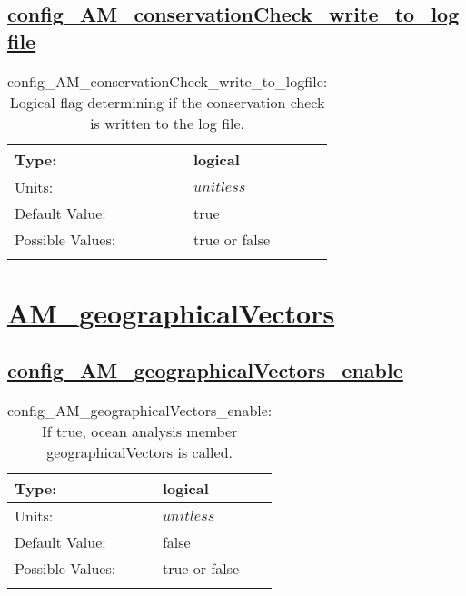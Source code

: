 \subsection[config\_AM\_conservationCheck\_write\_to\_logfile]{\hyperref[sec:nm_tab_AM_conservationCheck]{config\_AM\_conservationCheck\_write\_to\_logfile}}
\label{subsec:nm_sec_config_AM_conservationCheck_write_to_logfile}
\begin{center}
\begin{longtable}{| p{2.0in} || p{4.0in} |}
    \hline
    Type: & logical \\
    \hline
    Units: & $unitless$ \\
    \hline
    Default Value: & true \\
    \hline
    Possible Values: & true or false \\
    \hline
    \caption{config\_AM\_conservationCheck\_write\_to\_logfile: Logical flag determining if the conservation check is written to the log file.}
\end{longtable}
\end{center}
\section[AM\_geographicalVectors]{\hyperref[sec:nm_tab_AM_geographicalVectors]{AM\_geographicalVectors}}
\label{sec:nm_sec_AM_geographicalVectors}
\subsection[config\_AM\_geographicalVectors\_enable]{\hyperref[sec:nm_tab_AM_geographicalVectors]{config\_AM\_geographicalVectors\_enable}}
\label{subsec:nm_sec_config_AM_geographicalVectors_enable}
\begin{center}
\begin{longtable}{| p{2.0in} || p{4.0in} |}
    \hline
    Type: & logical \\
    \hline
    Units: & $unitless$ \\
    \hline
    Default Value: & false \\
    \hline
    Possible Values: & true or false \\
    \hline
    \caption{config\_AM\_geographicalVectors\_enable: If true, ocean analysis member geographicalVectors is called.}
\end{longtable}
\end{center}
